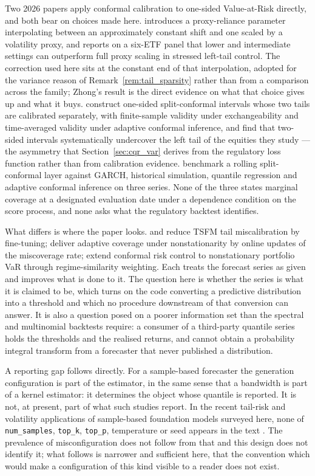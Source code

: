 \documentclass[preprint,11pt,authoryear]{elsarticle}
\newcommand{\1}{\boldsymbol{1}}
\begin{document}
Two 2026 papers apply conformal calibration to one-sided Value-at-Risk
directly, and both bear on choices made here. \citet{zhong2026proxy} introduces
a proxy-reliance parameter interpolating between an approximately constant shift
and one scaled by a volatility proxy, and reports on a six-ETF panel that lower
and intermediate settings can outperform full proxy scaling in stressed
left-tail control. The correction used here sits at the constant end of that
interpolation, adopted for the variance reason of
Remark~\ref{rem:tail_sparsity} rather than from a comparison across the family;
Zhong's result is the direct evidence on what that choice gives up and what it
buys. \citet{cuonzo2026tail} construct one-sided split-conformal intervals whose
two tails are calibrated separately, with finite-sample validity under
exchangeability and time-averaged validity under adaptive conformal inference,
and find that two-sided intervals systematically undercover the left tail of the
equities they study --- the asymmetry that Section~\ref{sec:cqr_var} derives
from the regulatory loss function rather than from calibration evidence.
\citet{aich2025temporal} benchmark a rolling split-conformal layer against
GARCH, historical simulation, quantile regression and adaptive conformal
inference on three series. None of the three states marginal coverage at a
designated evaluation date under a dependence condition on the score process,
and none asks what the regulatory backtest identifies.

What differs is where the paper looks. \citet{goel2024tsfmvar} and
\citet{goel2025volatility} reduce TSFM tail miscalibration by fine-tuning;
\citet{gibbs2021adaptive} deliver adaptive coverage under nonstationarity by
online updates of the miscoverage rate; \citet{tamingtailrisk2026} extend
conformal risk control to nonstationary portfolio VaR through regime-similarity
weighting. Each treats the forecast series as given and improves what is done to
it. The question here is whether the series is what it is claimed to be, which
turns on the code converting a predictive distribution into a threshold and which
no procedure downstream of that conversion can answer. It is also a question
posed on a poorer information set than the spectral and multinomial backtests
require: a consumer of a third-party quantile series holds the thresholds and the
realised returns, and cannot obtain a probability integral transform from a
forecaster that never published a distribution.

A reporting gap follows directly. For a sample-based forecaster the generation configuration is part of the estimator, in the same sense that a bandwidth is part of a kernel estimator: it determines the object whose quantile is reported. It is not, at present, part of what such studies report. In the recent tail-risk and volatility applications of sample-based foundation models surveyed here, none of \texttt{num\_samples}, \texttt{top\_k}, \texttt{top\_p}, temperature or seed appears in the text \citep[e.g.][]{rahimikia2025revisiting}. The prevalence of misconfiguration does not follow from that and this design does not identify it; what follows is narrower and sufficient here, that the convention which would make a configuration of this kind visible to a reader does not exist.
\end{document}
